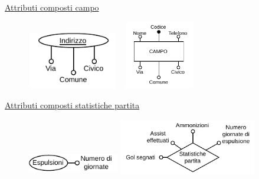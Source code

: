 \documentclass[11pt, openany]{article}
\theoremstyle{definition}
\theoremstyle{plain}
\theoremstyle{remark}
\begin{document}
				\underline{Attributi composti campo}
				\begin{figure}[h]
					\begin{minipage}[b]{8.5cm}
						\centering
						\includegraphics[width=4cm, height=2.5cm]{./include/bdsi-prog-2023-TRAD.C3.pdf}
					\end{minipage}
					\hspace{2mm} \hspace{3mm}
					\begin{minipage}[b]{8.5cm}
						\centering
						\includegraphics[width=3.5cm, height=3cm]{./include/bdsi-prog-2023-TRAD.L3.pdf}
					\end{minipage}
				\end{figure}
				
				\underline{Attributi composti statistiche partita}
				\begin{figure}[h!]
					\begin{minipage}[b]{8.5cm}
						\centering
						\includegraphics[width=4cm, height=1cm]{./include/bdsi-prog-2023-TRAD.C4.pdf}
					\end{minipage}
					\hspace{2mm} \hspace{3mm}
					\begin{minipage}[b]{8.5cm}
						\centering
						\includegraphics[width=6cm, height=2.5cm]{./include/bdsi-prog-2023-TRAD.L4.pdf}
					\end{minipage}
				\end{figure}
				
\end{document}
